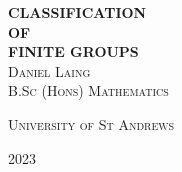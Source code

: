 \begin{titlepage}
\centering
\vspace*{0.12\textheight}
\textbf{\Huge CLASSIFICATION} \\ [\baselineskip]
\textbf{\Large OF} \\ [\baselineskip]
\textbf{\Huge FINITE GROUPS} \\ [\baselineskip]
\textsc{\Large Daniel Laing} \\ [\baselineskip]
\vfill\null%
{\small\scshape B.Sc (Hons) Mathematics}\par
{\small\scshape University of St Andrews}\par
{\small\scshape 2023}\par
\end{titlepage}
